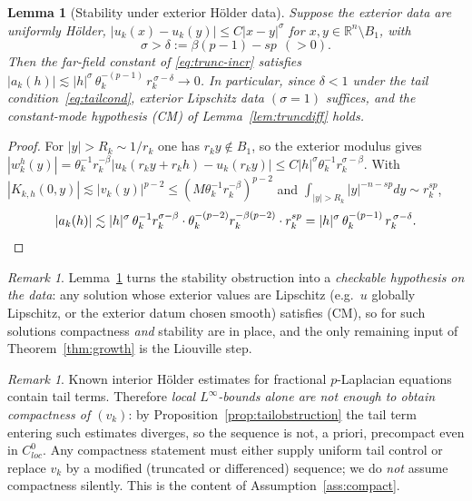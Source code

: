 \documentclass[11pt]{amsart}
\theoremstyle{plain}
\newtheorem{lemma}[theorem]{Lemma}
\theoremstyle{definition}
\theoremstyle{remark}
\newtheorem{remark}[theorem]{Remark}
\newcommand{\R}{\mathbb{R}}
\begin{document}
\begin{lemma}[Stability under exterior H\"older data]\label{lem:exterior}
Suppose the exterior data are uniformly H\"older,
$|u_k(x)-u_k(y)|\le C|x-y|^{\sigma}$ for $x,y\in\R^n\setminus B_1$, with
\[
  \sigma>\delta:=\beta(p-1)-sp\ \ (>0).
\]
Then the far-field constant of \eqref{eq:trunc-incr} satisfies
$|a_k(h)|\lesssim|h|^{\sigma}\,\theta_k^{-(p-1)}\,r_k^{\,\sigma-\delta}\to0$. In
particular, since $\delta<1$ under the tail condition~\eqref{eq:tailcond},
\emph{exterior Lipschitz data $(\sigma=1)$ suffices}, and the constant-mode
hypothesis \textnormal{(CM)} of Lemma~\ref{lem:truncdiff} holds.
\end{lemma}
\begin{proof}
For $|y|>R_k\sim 1/r_k$ one has $r_ky\notin B_1$, so the exterior modulus gives
$|w_k^h(y)|=\theta_k^{-1}r_k^{-\beta}|u_k(r_ky+r_kh)-u_k(r_ky)|\le
C|h|^{\sigma}\theta_k^{-1}r_k^{\sigma-\beta}$. With
$|K_{k,h}(0,y)|\lesssim|v_k(y)|^{p-2}\le(M\theta_k^{-1}r_k^{-\beta})^{p-2}$ and
$\int_{|y|>R_k}|y|^{-n-sp}dy\sim r_k^{sp}$,
\[
  |a_k(h)|\lesssim |h|^{\sigma}\,\theta_k^{-1}r_k^{\sigma-\beta}\cdot
   \theta_k^{-(p-2)}r_k^{-\beta(p-2)}\cdot r_k^{sp}
   =|h|^{\sigma}\,\theta_k^{-(p-1)}\,r_k^{\,\sigma-\delta}.\qedhere
\]
\end{proof}

\begin{remark}\label{rem:exterior}
Lemma~\ref{lem:exterior} turns the stability obstruction into a
\emph{checkable hypothesis on the data}: any solution whose exterior values are
Lipschitz (e.g.\ $u$ globally Lipschitz, or the exterior datum chosen smooth)
satisfies \textnormal{(CM)}, so for such solutions compactness \emph{and}
stability are in place, and the only remaining input of
Theorem~\ref{thm:growth} is the Liouville step.
\end{remark}

\begin{remark}\label{rem:nocompact}
Known interior H\"older estimates for fractional $p$-Laplacian equations
contain tail terms. Therefore \emph{local $L^\infty$-bounds alone are not
enough to obtain compactness of $(v_k)$}: by
Proposition~\ref{prop:tailobstruction} the tail term entering such estimates
diverges, so the sequence is not, a priori, precompact even in
$C^0_{loc}$. Any compactness statement must either supply uniform tail control
or replace $v_k$ by a modified (truncated or differenced) sequence; we do
\emph{not} assume compactness silently. This is the content of
Assumption~\ref{ass:compact}.
\end{remark}
\end{document}
